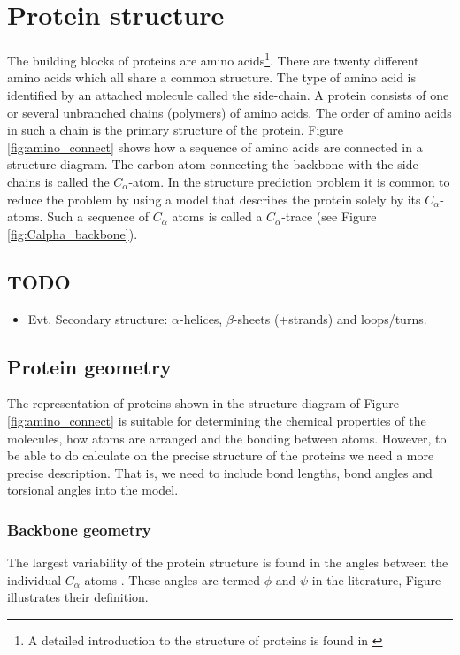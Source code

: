 \documentclass[10pt,a4paper,final,oneside,openany,article,twocolumn]{memoir}
\begin{document}
\section{Protein structure}
The building blocks of proteins are amino acids\footnote{A detailed
  introduction to the structure of proteins is found in
  \cite{branden}}. There are twenty different amino acids which all
share a common structure. The type of amino acid is identified by an
attached molecule called the side-chain. A protein consists of one or
several unbranched chains (polymers) of amino acids. The order of
amino acids in such a chain is the primary structure of the protein.
Figure \ref{fig:amino_connect} shows how a sequence of amino acids are
connected in a structure diagram. The carbon atom connecting the
backbone with the side-chains is called the $C_\alpha$-atom. In the
structure prediction problem it is common  to reduce the
problem by using a model that describes the protein solely by its
$C_\alpha$-atoms. Such a sequence of $C_{\alpha}$ atoms is called a
$C_{\alpha}$-trace (see Figure \ref{fig:Calpha_backbone}).

\subsection{\small TODO}
\begin{itemize}
\item Evt. Secondary structure: $\alpha$-helices, $\beta$-sheets (+strands) and loops/turns.
\end{itemize}


\subsection{Protein geometry}
The representation of proteins shown in the structure diagram of
Figure \ref{fig:amino_connect} is suitable for determining the
chemical properties of the molecules, how atoms are arranged and the
bonding between atoms. However, to be able to do calculate on the
precise structure of the proteins we need a more precise
description. That is, we need to include bond lengths, bond angles and
torsional angles into the model.

\subsubsection{Backbone geometry}
The largest variability of the protein structure is found in the
angles between the individual $C_\alpha$-atoms \cite{lotan04}. These
angles are termed $\phi$ and $\psi$ in the literature, Figure
 illustrates their definition.
\end{document}
